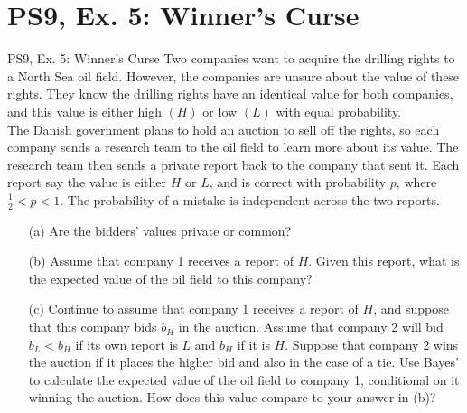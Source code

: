 \section{PS9, Ex. 5: Winner's Curse}

\begin{frame}{PS9, Ex. 5: Winner's Curse}
      Two companies want to acquire the drilling rights to a North Sea oil field. However, the companies are unsure about the value of these rights. They know the drilling rights have an identical value for both companies, and this value is either high $(H)$ or low $(L)$ with equal probability.\\\medskip
      The Danish government plans to hold an auction to sell off the rights, so each company sends a research team to the oil field to learn more about its value. The research team then sends a private report back to the company that sent it. Each report say the value is either $H$ or $L$, and is correct with probability $p$, where $\frac{1}{2} < p < 1$. The probability of a mistake is independent across the two reports.
      \begin{itemize}
        \item[(a)] Are the bidders’ values private or common?
        \item[(b)] Assume that company 1 receives a report of $H$. Given this report, what is the expected value of the oil field to this company?
        \item[(c)] Continue to assume that company 1 receives a report of $H$, and suppose that this company bids $b_H$ in the auction. Assume that company 2 will bid $b_L < b_H$ if its own report is $L$ and $b_H$ if it is $H$. Suppose that company 2 wins the auction if it places the higher bid and also in the case of a tie. Use Bayes’ to calculate the expected value of the oil field to company 1, conditional on it winning the auction. How does this value compare to your answer in (b)?
      \end{itemize}
      \vfill\null
\end{frame}


